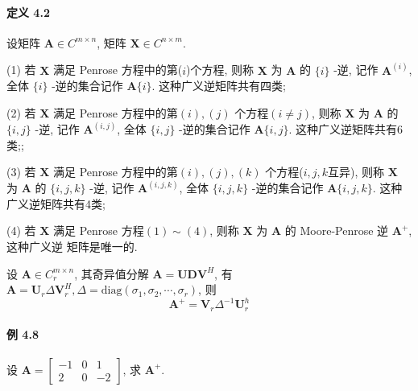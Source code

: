 \paragraph*{定义 4.2} 设矩阵 $\bm{A} \in C^{m\times n}$, 矩阵 $\bm{X} \in C^{n\times m}$.
\par (1) 若 $\bm{X}$ 满足 Penrose 方程中的第($i$)个方程, 则称 $\bm{X}$ 为 $\bm{A}$ 的 $\{i\}$ -逆, 记作 $\bm{A}^{(i)}$, 全体
$\{i\}$ -逆的集合记作 $\bm{A}\{i\}$. 这种广义逆矩阵共有四类;
\par (2) 若 $\bm{X}$ 满足 Penrose 方程中的第$(i),(j)$ 个方程$(i\neq j)$, 则称 $\bm{X}$ 为 $\bm{A}$ 的 $\{i,j\}$ -逆, 记作
$\bm{A}^{(i,j)}$, 全体 $\{i,j\}$ -逆的集合记作 $\bm{A}\{i,j\}$. 这种广义逆矩阵共有6类;;
\par (3) 若 $\bm{X}$ 满足 Penrose 方程中的第$(i),(j),(k)$ 个方程($i,j,k$互异), 则称 $\bm{X}$ 为 $\bm{A}$ 的 $\{i,j,k\}$
-逆, 记作 $\bm{A}^{(i,j,k)}$, 全体 $\{i,j,k\}$ -逆的集合记作 $\bm{A}\{i,j,k\}$. 这种广义逆矩阵共有4类;
\par (4) 若 $\bm{X}$ 满足 Penrose 方程$(1) \sim (4)$, 则称 $\bm{X}$ 为 $\bm{A}$ 的 Moore-Penrose 逆 $\bm{A}^+$, 这种广义逆
矩阵是唯一的.

\par 设 $\bm{A} \in C^{m\times n}_r$, 其奇异值分解 $\bm{A} = \bm{UDV}^H$, 有 $\bm{A} = \bm{U}_r\Delta\bm{V}_r^H, \Delta = \mathrm{diag}(\sigma_1, \sigma_2, \cdots, \sigma_r)$, 则
$$
    \bm{A}^+ = \bm{V}_r\Delta^{-1}\bm{U}_r^h
$$

\paragraph*{例 4.8} 设 $\bm{A} = \begin{bmatrix}
        -1 & 0 & 1  \\
        2  & 0 & -2
    \end{bmatrix}$, 求 $\bm{A}^+$.

